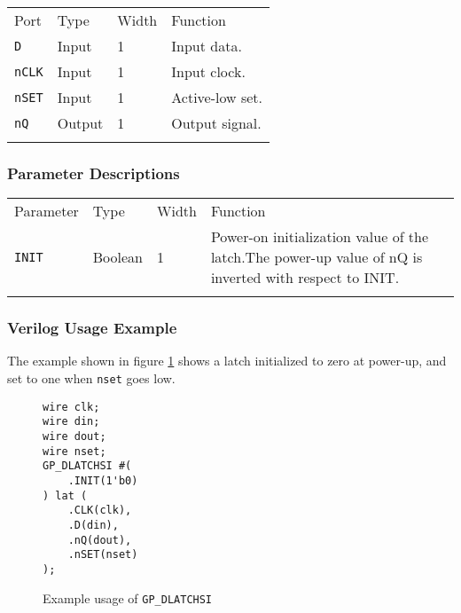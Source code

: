 \documentclass[11pt]{article}
\newcommand{\tokenstyle}[1]{\texttt{#1}}
\newcommand{\wirestyle}[1]{\texttt{#1}}
\newcommand{\whenstyle}[1]{{\fontseries{sb}\selectfont#1}}
\newcommand{\thinhline}{\Xhline{1\arrayrulewidth}}
\newcommand{\thickhline}{\Xhline{2.5\arrayrulewidth}}
\begin{document}
\begin{tabularx}{\textwidth}{lllX}
\thinhline
\whenstyle{Port} & \whenstyle{Type} & \whenstyle{Width} & \whenstyle{Function} \\
\thickhline
\tokenstyle{D} & Input & 1 & Input data. \\
\thinhline
\tokenstyle{nCLK} & Input & 1 & Input clock. \\
\thinhline
\tokenstyle{nSET} & Input & 1 & Active-low set. \\
\thinhline
\tokenstyle{nQ} & Output & 1 & Output signal. \\
\thinhline
\end{tabularx}

\subsubsection{Parameter Descriptions}

\begin{tabularx}{\textwidth}{lllX}
\thinhline
\whenstyle{Parameter} & \whenstyle{Type} & \whenstyle{Width} & \whenstyle{Function} \\
\thickhline
\tokenstyle{INIT} & Boolean & 1 & Power-on initialization value of the latch.\newline The power-up value of nQ is
inverted with respect to INIT.\\
\thinhline
\end{tabularx}

\subsubsection{Verilog Usage Example}

The example shown in figure \ref{gp-dlatchsi-example} shows a latch initialized to zero at power-up, and set to one
when \wirestyle{nset} goes low.

\begin{figure}[h]
\begin{lstlisting}
wire clk;
wire din;
wire dout;
wire nset;
GP_DLATCHSI #(
	.INIT(1'b0)
) lat (
	.CLK(clk),
	.D(din),
	.nQ(dout),
	.nSET(nset)
);
\end{lstlisting}
\caption{Example usage of \tokenstyle{GP\_DLATCHSI}}
\label{gp-dlatchsi-example}
\end{figure}


\pagebreak
\end{document}
